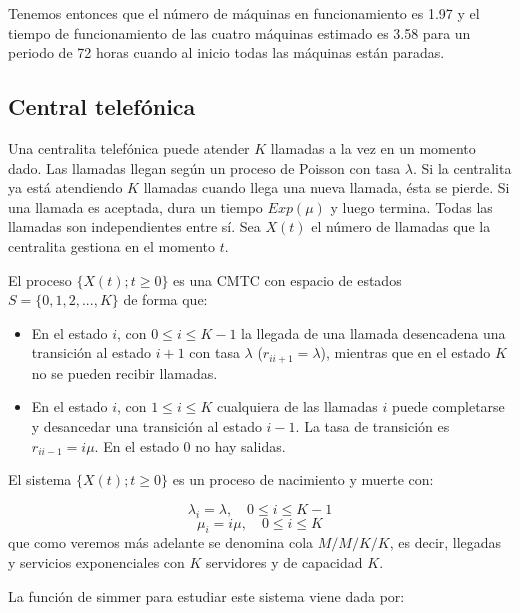 \documentclass[
]{book}
\theoremstyle{definition}
\theoremstyle{definition}
\theoremstyle{definition}
\theoremstyle{definition}
\theoremstyle{remark}
\begin{document}
Tenemos entonces que el número de máquinas en funcionamiento es 1.97 y el tiempo de funcionamiento de las cuatro máquinas estimado es 3.58 para un periodo de 72 horas cuando al inicio todas las máquinas están paradas.

\hypertarget{central-telefuxf3nica}{%
\subsection{Central telefónica}\label{central-telefuxf3nica}}

Una centralita telefónica puede atender \(K\) llamadas a la vez en un momento dado. Las llamadas llegan según un proceso de Poisson con tasa \(\lambda\). Si la centralita ya está atendiendo \(K\) llamadas cuando llega una nueva llamada, ésta se pierde. Si una llamada es aceptada, dura un tiempo \(Exp(\mu)\) y luego termina. Todas las llamadas son independientes entre sí. Sea \(X(t)\) el número de llamadas que la centralita gestiona en el momento \(t\).

El proceso \(\{X(t); t \geq 0\}\) es una CMTC con espacio de estados \(S = \{0, 1, 2,...,K\}\) de forma que:

\begin{itemize}
\item
  En el estado \(i\), con \(0 \leq i \leq K-1\) la llegada de una llamada desencadena una transición al estado \(i+1\) con tasa \(\lambda\) (\(r_{i i+1} = \lambda\)), mientras que en el estado \(K\) no se pueden recibir llamadas.
\item
  En el estado \(i\), con \(1 \leq i \leq K\) cualquiera de las llamadas \(i\) puede completarse y desancedar una transición al estado \(i-1\). La tasa de transición es \(r_{i i-1} = i\mu\). En el estado 0 no hay salidas.
\end{itemize}

El sistema \(\{X(t); t \geq 0\}\) es un proceso de nacimiento y muerte con:

\[\lambda_i = \lambda, \quad 0 \leq i \leq K-1\] \[\mu_i = i\mu, \quad 0 \leq i \leq K\] que como veremos más adelante se denomina cola \(M/M/K/K\), es decir, llegadas y servicios exponenciales con \(K\) servidores y de capacidad \(K\).

La función de simmer para estudiar este sistema viene dada por:
\end{document}
